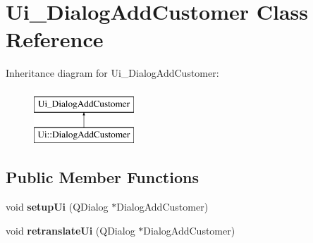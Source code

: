 \hypertarget{classUi__DialogAddCustomer}{\section{Ui\-\_\-\-Dialog\-Add\-Customer Class Reference}
\label{classUi__DialogAddCustomer}
}
Inheritance diagram for Ui\-\_\-\-Dialog\-Add\-Customer\-:\begin{figure}[H]
\begin{center}
\leavevmode
\includegraphics[height=2.000000cm]{da/d16/classUi__DialogAddCustomer}
\end{center}
\end{figure}
\subsection*{Public Member Functions}
\begin{DoxyCompactItemize}
\item 
\hypertarget{classUi__DialogAddCustomer_a76859b6a0a41e6fb3a19e657d9671f37}{void {\bfseries setup\-Ui} (Q\-Dialog $\ast$Dialog\-Add\-Customer)}\label{classUi__DialogAddCustomer_a76859b6a0a41e6fb3a19e657d9671f37}

\item 
\hypertarget{classUi__DialogAddCustomer_a209d9a70245239471453c67278f48b45}{void {\bfseries retranslate\-Ui} (Q\-Dialog $\ast$Dialog\-Add\-Customer)}\label{classUi__DialogAddCustomer_a209d9a70245239471453c67278f48b45}

\end{DoxyCompactItemize}
